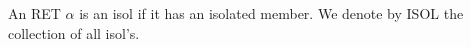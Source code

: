 An RET $\alpha$ is an isol if it has an isolated member. We denote by ISOL the collection of all isol's.
